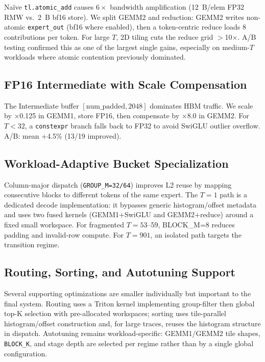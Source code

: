 \documentclass[11pt,twocolumn]{article}
\begin{document}
Na\"ive \texttt{tl.atomic\_add} causes $6\times$ bandwidth amplification (12~B/elem FP32 RMW vs.\ 2~B bf16 store).
We split GEMM2 and reduction: GEMM2 writes non-atomic \texttt{expert\_out} (bf16 where enabled), then a token-centric reduce loads 8 contributions per token. For large $T$, 2D tiling cuts the reduce grid $>$10$\times$.
A/B testing confirmed this as one of the largest single gains, especially on medium-$T$ workloads where atomic contention previously dominated.

\subsection{FP16 Intermediate with Scale Compensation}

The Intermediate buffer $[\text{num\_padded}, 2048]$ dominates HBM traffic.
We scale by $\times$0.125 in GEMM1, store FP16, then compensate by $\times$8.0 in GEMM2.
For $T{<}32$, a \texttt{constexpr} branch falls back to FP32 to avoid SwiGLU outlier overflow.
A/B: mean +4.5\% (13/19 improved).

\subsection{Workload-Adaptive Bucket Specialization}

Column-major dispatch (\texttt{GROUP\_M=32/64}) improves L2 reuse by mapping consecutive blocks to different tokens of the same expert.
The $T{=}1$ path is a dedicated decode implementation: it bypasses generic histogram/offset metadata and uses two fused kernels (GEMM1+SwiGLU and GEMM2+reduce) around a fixed small workspace.
For fragmented $T{=}53$--59, BLOCK\_M=8 reduces padding and invalid-row compute. For $T{=}901$, an isolated path targets the transition regime.

\subsection{Routing, Sorting, and Autotuning Support}

Several supporting optimizations are smaller individually but important to the final system.
Routing uses a Triton kernel implementing group-filter then global top-K selection with pre-allocated workspaces; sorting uses tile-parallel histogram/offset construction and, for large traces, reuses the histogram structure in dispatch.
Autotuning remains workload-specific: GEMM1/GEMM2 tile shapes, \texttt{BLOCK\_K}, and stage depth are selected per regime rather than by a single global configuration.
\end{document}
